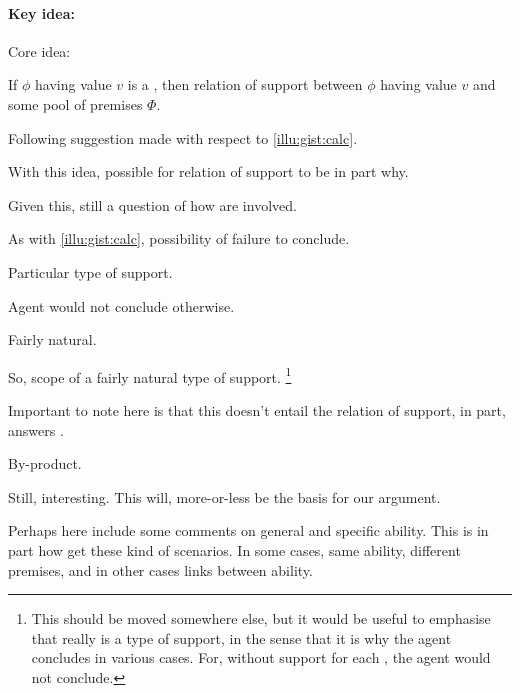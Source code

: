 \paragraph{Key idea: }

\begin{note}
  Core idea:
  \begin{idea}
    \label{idea:fc-and-support}
    If \(\phi\) having value \(v\) is a , then relation of support between \(\phi\) having value \(v\) and some pool of premises \(\Phi\).
  \end{idea}

  Following suggestion made with respect to \autoref{illu:gist:calc}.

  With this idea, possible for relation of support to be in part why.

  Given this, still a question of how  are involved.
\end{note}

\begin{note}
  As with \autoref{illu:gist:calc}, possibility of failure to conclude.

  Particular type of support.

  Agent would not conclude otherwise.

  Fairly natural.
\end{note}

\begin{note}
  So, scope of a fairly natural type of support.%
  \footnote{
    \color{red}
    This should be moved somewhere else, but it would be useful to emphasise that \zS{} really is a type of support, in the sense that it is why the agent concludes in various cases.
    For, without support for each \requ{}, the agent would not conclude.
  }
\end{note}

\begin{note}
  \color{red}
  Important to note here is that this doesn't entail the relation of support, in part, answers \qWhyV{}.

  By-product.

  Still, interesting.
  This will, more-or-less be the basis for our argument.
\end{note}

\begin{note}
  \color{blue}
  Perhaps here include some comments on general and specific ability.
  This is in part how get these kind of scenarios.
  In some cases, same ability, different premises, and in other cases links between ability.
\end{note}

